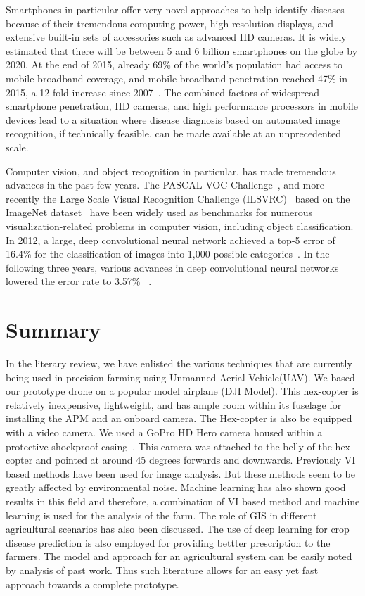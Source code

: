 Smartphones in particular offer very novel approaches to help identify diseases because of their tremendous computing power, high-resolution displays, and extensive built-in sets of accessories such as advanced HD cameras. It is widely estimated that there will be between 5 and 6 billion smartphones on the globe by 2020. At the end of 2015, already 69\% of the world’s population had access to mobile broadband coverage, and mobile broadband penetration reached 47\% in 2015, a 12-fold increase since 2007~\cite{bold2012mobile}. The combined factors of widespread smartphone penetration, HD cameras, and high performance processors in mobile devices lead to a situation where disease diagnosis based on automated image recognition, if technically feasible, can be made available at an unprecedented scale. 

Computer vision, and object recognition in particular, has made tremendous advances in the past few years. The PASCAL VOC Challenge~\cite{he2016deep}, and more recently the Large Scale Visual Recognition Challenge (ILSVRC)~\cite{hernandez2014integrating} based on the ImageNet dataset~\cite{huang2007application} have been widely used as benchmarks for numerous visualization-related problems in computer vision, including object classification. In 2012, a large, deep convolutional neural network achieved a top-5 error of 16.4\% for the classification of images into 1,000 possible categories~\cite{hughes2015open}. In the following three years, various advances in deep convolutional neural networks lowered the error rate to 3.57\% ~\cite{hughes2015open,facts2015figures,jia2014caffe,krizhevsky2012imagenet,lecun1989backpropagation}.


\section{Summary}

In the literary review, we have enlisted the various techniques that are currently being used in precision farming using Unmanned Aerial Vehicle(UAV). We based our prototype drone on a popular model airplane (DJI Model). This hex-copter is relatively inexpensive, lightweight, and has ample room within its fuselage for installing the APM and an onboard camera. The Hex-copter is also be equipped with a video camera. We used a GoPro HD Hero camera housed within a protective shockproof casing~\cite{NewTab52:online}. This camera was attached to the belly of the hex-copter and pointed at around 45 degrees forwards and downwards. Previously VI based methods have been used for image analysis. But these methods seem to be greatly affected by environmental noise. Machine learning has also shown good results in this field and therefore, a combination of VI based method and machine learning  is used for the analysis of the farm. The role of GIS in different agricultural scenarios has also been discussed. The use of deep learning for crop disease prediction is also employed for providing bettter prescription to the farmers. The model and approach for an agricultural system can be easily noted by analysis of past work. Thus such literature allows for an easy yet fast approach towards a complete prototype.